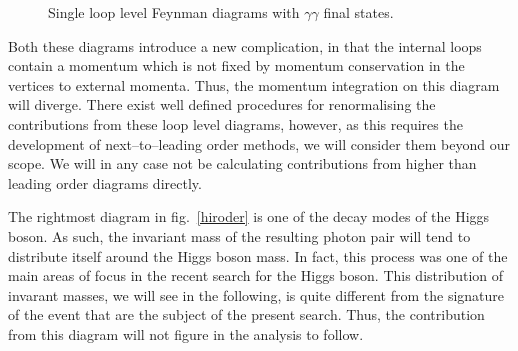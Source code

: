 \begin{figure}[hbtp]
\begin{minipage}[b]{.49\textwidth}
\begin{center}\begin{footnotesize}
\end{footnotesize}\end{center}
\end{minipage}\hfill
\begin{minipage}[b]{.49\textwidth}
\centering\footnotesize
{}
\end{minipage}
\caption{Single loop level Feynman diagrams with $\gamma\gamma$ final states.}\label{hiorder}
\end{figure}

Both these diagrams introduce a new complication, in that the internal loops contain a momentum which is not fixed by momentum conservation in the vertices to external momenta. Thus, the momentum integration on this diagram will diverge. There exist well defined procedures for renormalising the contributions from these loop level diagrams, however, as this requires the development of next--to--leading order methods, we will consider them beyond our scope. We will in any case not be calculating contributions from higher than leading order diagrams directly.

The rightmost diagram in fig.~\ref{hiroder} is one of the decay modes of the Higgs boson. As such, the invariant mass of the resulting photon pair will tend to distribute itself around the Higgs boson mass. In fact, this process was one of the main areas of focus in the recent search for the Higgs boson. This distribution of invarant masses, we will see in the following, is quite different from the signature of the event that are the subject of the present search. Thus, the contribution from this diagram will not figure in the analysis to follow.